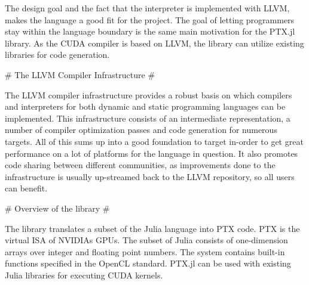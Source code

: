\begin{markdown}
The design goal and the fact that the interpreter is implemented with
\gls{LLVM}, makes the language a good fit for the project. The goal of
letting programmers stay within the language boundary is the same main
motivation for the PTX.jl library. As the \gls{CUDA} compiler is based
on \gls{LLVM}, the library can utilize existing libraries for code
generation.

# The LLVM Compiler Infrastructure #

The \gls{LLVM} compiler infrastructure provides a robust basis on
which compilers and interpreters for both dynamic and static
programming languages can be implemented. This infrastructure consists
of an intermediate representation, a number of compiler optimization
passes and code generation for numerous targets. All of this sums up
into a good foundation to target in-order to get great performance on a
lot of platforms for the language in question. It also promotes code
sharing between different communities, as improvements done to the
infrastructure is usually up-streamed back to the LLVM repository, so
all users can benefit.

# Overview of the library #

The library translates a subset of the Julia language into \gls{PTX}
code. \gls{PTX} is the virtual \gls{ISA} of NVIDIAs \glspl{GPU}. The
subset of Julia consists of one-dimension arrays over integer and
floating point numbers. The system contains built-in functions
specified in the \gls{OpenCL} standard. PTX.jl can be used
with existing Julia libraries for executing CUDA kernels.

\end{markdown}
